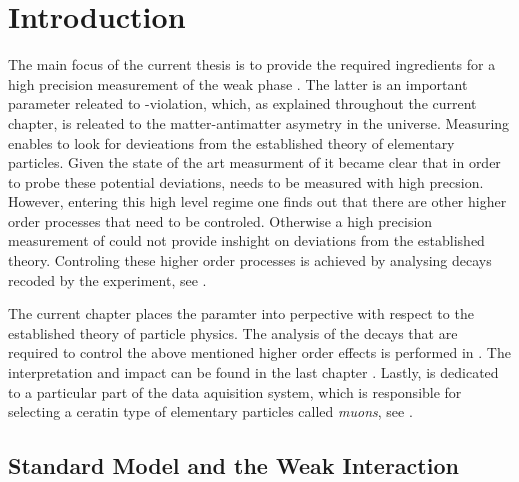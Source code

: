 
\chapter{Introduction}
\label{Introduction}

The main focus of the current thesis is to provide the required ingredients for a high precision measurement of
the weak phase \phis. The latter is an important parameter releated to \CP-violation, which, as explained throughout
the current chapter, is releated to the matter-antimatter asymetry in the universe. Measuring \phis enables to look
for devieations from the established theory of elementary particles. Given the state of the art measurment of \phis
it became clear that in order to probe these potential deviations, \phis needs to be measured with high precsion.
However, entering this high level regime one finds out that there are other higher order processes that need to be
controled. Otherwise a high precision measurement of \phis could not provide inshight on deviations from the
established theory. Controling these higher order processes is achieved by analysing \BsJpsiKst decays recoded
by the \lhcb experiment, see .

The current chapter places the \phis paramter into perpective with respect to the established theory of particle
physics. The analysis of the \BsJpsiKst decays that are required to control the above mentioned higher order effects
is performed in . The interpretation and impact can be found in the last chapter .
Lastly,  is dedicated to a particular part of the \lhcb data aquisition system, which is responsible for
selecting a ceratin type of elementary particles called {\it muons}, see .


\section{Standard Model and the Weak Interaction}
\label{The_Standard_Model}


